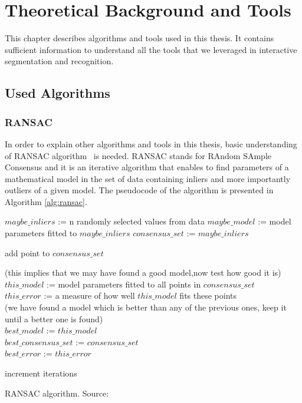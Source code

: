 \chapter{Theoretical Background and Tools}
\label{chapter:Background}
This chapter describes algorithms and tools used in this thesis. It contains sufficient information to understand all the tools that we leveraged in interactive segmentation and recognition.
\section{Used Algorithms}
\subsection{RANSAC}
In order to explain other algorithms and tools in this thesis, basic understanding of RANSAC algorithm~\cite{ransac} is needed. RANSAC stands for RAndom SAmple Consensus and it is an iterative algorithm that enables to find parameters of a mathematical model in the set of data containing inliers and more importantly outliers of a given model. The pseudocode of the algorithm is presented in Algorithm \ref{alg:ransac}. 

\begin{algorithm}[htb!]
{
$maybe\_inliers$ := n randomly selected values from data
$maybe\_model$ := model parameters fitted to $maybe\_inliers$
$consensus\_set$ := $maybe\_inliers$

{

{
add point to $consensus\_set$
}

}

{
(this implies that we may have found a good model,now test how good it is)\\
$this\_model$ := model parameters fitted to all points in $consensus\_set$\\
$this\_error$ := a measure of how well $this\_model$ fits these points\\



{            (we have found a model which is better than any of the previous ones,
            keep it until a better one is found)\\
            $best\_model$ := $this\_model$\\
            $best\_consensus\_set$ := $consensus\_set$\\
            $best\_error$ := $this\_error$\\
}


}
    increment iterations

}


\caption{RANSAC algorithm. Source:~\cite{ransac}}
  \label{alg:ransac}
\end{algorithm}

